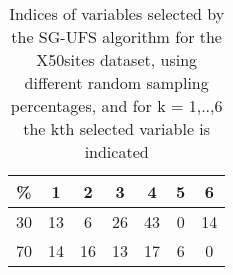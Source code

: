 \begin{table}
	\begin{center}
		\begin{tabular}{c c c c c c c}
			\% & 1 & 2 & 3 & 4 & 5 & 6 \\
			\hline
			30 & 13 & 6 & 26 & 43 & 0 & 14 \\
			70 & 14 & 16 & 13 & 17 & 6 & 0 \\
		\end{tabular}
	\end{center}
	\caption{Indices of variables selected by the SG-UFS algorithm for the X50sites dataset, using different random sampling percentages, and for k = 1,..,6 the kth selected variable is indicated}
\end{table}